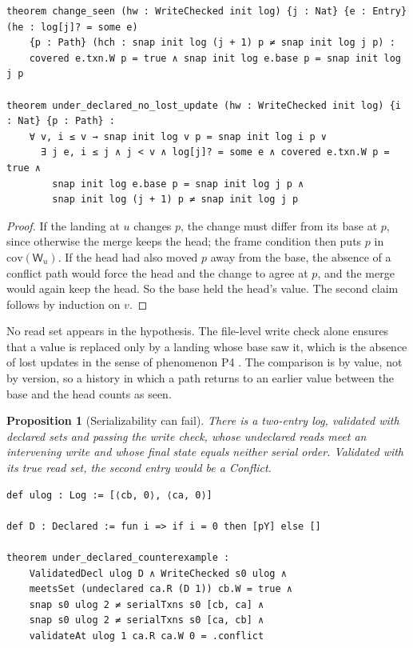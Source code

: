 \documentclass[11pt,letterpaper]{article}
\newtheorem{proposition}[theorem]{Proposition}
\theoremstyle{definition}
\theoremstyle{remark}
\newcommand{\W}{\mathsf{W}}
\newcommand{\op}[1]{\mathrm{#1}}
\newcommand{\covd}{\op{cov}}
\begin{document}
\begin{lstlisting}[language=Lean,caption={No lost update under the write check (\texttt{YonedaTx/UnderDeclared.lean})},label={lst:mcbl:udnlu}]
theorem change_seen (hw : WriteChecked init log) {j : Nat} {e : Entry} (he : log[j]? = some e)
    {p : Path} (hch : snap init log (j + 1) p ≠ snap init log j p) :
    covered e.txn.W p = true ∧ snap init log e.base p = snap init log j p

theorem under_declared_no_lost_update (hw : WriteChecked init log) {i : Nat} {p : Path} :
    ∀ v, i ≤ v → snap init log v p = snap init log i p ∨
      ∃ j e, i ≤ j ∧ j < v ∧ log[j]? = some e ∧ covered e.txn.W p = true ∧
        snap init log e.base p = snap init log j p ∧
        snap init log (j + 1) p ≠ snap init log j p
\end{lstlisting}

\begin{proof}
If the landing at $u$ changes $p$, the change must differ from its base at $p$, since otherwise the merge keeps the head; the frame condition then puts $p$ in $\covd(\W_u)$. If the head had also moved $p$ away from the base, the absence of a conflict path would force the head and the change to agree at $p$, and the merge would again keep the head. So the base held the head's value. The second claim follows by induction on $v$.
\end{proof}

No read set appears in the hypothesis. The file-level write check alone ensures that a value is replaced only by a landing whose base saw it, which is the absence of lost updates in the sense of phenomenon P4 \cite{berenson1995critique}. The comparison is by value, not by version, so a history in which a path returns to an earlier value between the base and the head counts as seen.

\begin{proposition}[Serializability can fail]
\label{prop:mcbl:udce}
There is a two-entry log, validated with declared sets and passing the write check, whose undeclared reads meet an intervening write and whose final state equals neither serial order. Validated with its true read set, the second entry would be a Conflict.
\end{proposition}

\begin{lstlisting}[language=Lean,caption={Serializability fails under under-declared reads (\texttt{YonedaTx/UnderDeclared.lean})},label={lst:mcbl:udce}]
def ulog : Log := [⟨cb, 0⟩, ⟨ca, 0⟩]

def D : Declared := fun i => if i = 0 then [pY] else []

theorem under_declared_counterexample :
    ValidatedDecl ulog D ∧ WriteChecked s0 ulog ∧
    meetsSet (undeclared ca.R (D 1)) cb.W = true ∧
    snap s0 ulog 2 ≠ serialTxns s0 [cb, ca] ∧
    snap s0 ulog 2 ≠ serialTxns s0 [ca, cb] ∧
    validateAt ulog 1 ca.R ca.W 0 = .conflict
\end{lstlisting}
\end{document}
